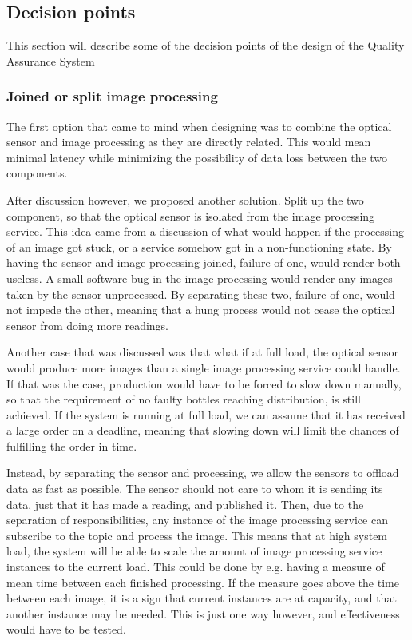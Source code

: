 \subsection{Decision points}
This section will describe some of the decision points of the design of the Quality Assurance System


\subsubsection{Joined or split image processing}
The first option that came to mind when designing was to combine the optical sensor and image processing as they are directly related. This would mean minimal latency while minimizing the possibility of data loss between the two components. 

After discussion however, we proposed another solution. Split up the two component, so that the optical sensor is isolated from the image processing service. This idea came from a discussion of what would happen if the processing of an image got stuck, or a service somehow got in a non-functioning state. By having the sensor and image processing joined, failure of one, would render both useless. A small software bug in the image processing would render any images taken by the sensor unprocessed. By separating these two, failure of one, would not impede the other, meaning that a hung process would not cease the optical sensor from doing more readings. 

Another case that was discussed was that what if at full load, the optical sensor would produce more images than a single image processing service could handle. If that was the case, production would have to be forced to slow down manually, so that the requirement of no faulty bottles reaching distribution, is still achieved. If the system is running at full load, we can assume that it has received a large order on a deadline, meaning that slowing down will limit the chances of fulfilling the order in time. 

Instead, by separating the sensor and processing, we allow the sensors to offload data as fast as possible. The sensor should not care to whom it is sending its data, just that it has made a reading, and published it. Then, due to the separation of responsibilities, any instance of the image processing service can subscribe to the topic and process the image. This means that at high system load, the system will be able to scale the amount of image processing service instances to the current load. This could be done by e.g. having a measure of mean time between each finished processing. If the measure goes above the time between each image, it is a sign that current instances are at capacity, and that another instance may be needed. This is just one way however, and effectiveness would have to be tested. 

